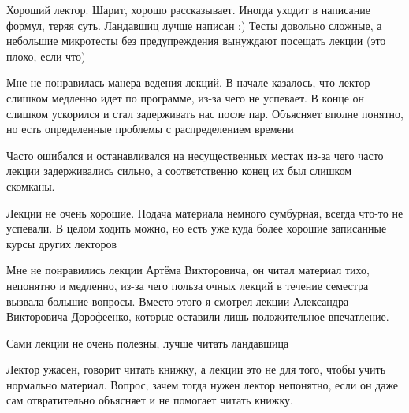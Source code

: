             \begin{commentbox} 
                Хороший лектор. Шарит, хорошо рассказывает. Иногда уходит в написание формул, теряя суть. Ландавшиц лучше написан :) 
                Тесты довольно сложные, а небольшие микротесты без предупреждения вынуждают посещать лекции (это плохо, если что) 
            \end{commentbox} 
        
            \begin{commentbox} 
                Мне не понравилась манера ведения лекций. В начале казалось, что лектор слишком медленно идет по программе, из-за чего не успевает. В конце он слишком ускорился и стал задерживать нас после пар. Объясняет вполне понятно, но есть определенные проблемы с распределением времени 
            \end{commentbox} 
        
            \begin{commentbox} 
                Часто ошибался и останавливался на несущественных местах из-за чего часто лекции задерживались сильно, а соответственно конец их был слишком скомканы. 
            \end{commentbox} 
        
            \begin{commentbox} 
                Лекции не очень хорошие. Подача материала немного сумбурная, всегда что-то не успевали. В целом ходить можно, но есть уже куда более хорошие записанные курсы других лекторов 
            \end{commentbox} 
        
            \begin{commentbox} 
                Мне не понравились лекции Артёма Викторовича, он читал материал тихо, непонятно и медленно, из-за чего польза очных лекций в течение семестра вызвала большие вопросы. Вместо этого я смотрел лекции Александра Викторовича Дорофеенко, которые оставили лишь положительное впечатление. 
            \end{commentbox} 
        
            \begin{commentbox} 
                Сами лекции не очень полезны, лучше читать ландавшица 
            \end{commentbox} 
        
            \begin{commentbox} 
                Лектор ужасен, говорит читать книжку, а лекции это не для того, чтобы учить нормально материал. Вопрос, зачем тогда нужен лектор непонятно, если он даже сам отвратительно объясняет и не помогает читать книжку. 
            \end{commentbox} 
        

